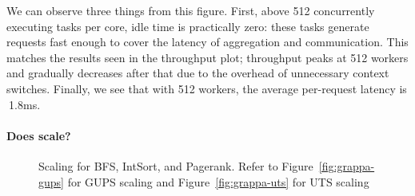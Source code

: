 We can observe three things from this figure. First, above 512
concurrently executing tasks per core, idle time is practically zero:
these tasks generate requests fast enough to cover the latency of
aggregation and communication. This matches the results seen in the
throughput plot; throughput peaks at 512 workers and gradually
decreases after that due to the overhead of unnecessary context
switches. Finally, we see that with 512 workers, the average
per-request latency is $~$1.8ms.

\paragraph{Does \Grappa scale?}


\begin{figure}[ht]
    \begin{center}
      \qquad
      \qquad
      \qquad
    \end{center}
    \caption{Scaling for BFS, IntSort, and Pagerank. Refer to Figure~\ref{fig:grappa-gups} for GUPS scaling and Figure~\ref{fig:grappa-uts} for UTS scaling}
    \label{fig:grappa-scaling}
\end{figure}

